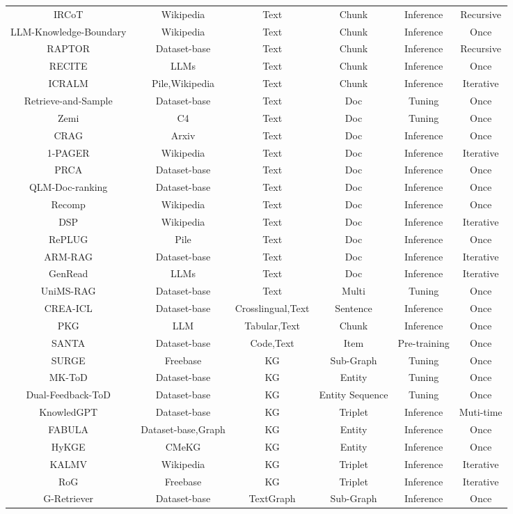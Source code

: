 \begin{table}
{\begin{tabular}{cccccc}
IRCoT~& Wikipedia& Text& Chunk& Inference&Recursive\\
LLM-Knowledge-Boundary~& Wikipedia& Text& Chunk& Inference&Once\\
RAPTOR~& Dataset-base&Text& Chunk& Inference&Recursive\\
RECITE~&   LLMs&Text&  Chunk&  Inference&Once\\ 
ICRALM~& Pile,Wikipedia& Text& Chunk& Inference&Iterative\\
Retrieve-and-Sample~& Dataset-base& Text& Doc& Tuning&Once\\
Zemi~& C4& Text& Doc& Tuning&Once\\
CRAG~& Arxiv& Text& Doc & Inference&Once\\
1-PAGER~ & Wikipedia& Text& Doc& Inference&Iterative\\
PRCA~& Dataset-base& Text& Doc& Inference&Once\\
QLM-Doc-ranking~& Dataset-base& Text& Doc& Inference&Once\\
Recomp~& Wikipedia& Text& Doc& Inference&Once\\
DSP~& Wikipedia& Text& Doc& Inference&Iterative\\
RePLUG~& Pile& Text& Doc& Inference&Once\\
ARM-RAG~& Dataset-base& Text& Doc& Inference&Iterative\\
GenRead~&   LLMs&Text&  Doc&  Inference&Iterative\\ 
UniMS-RAG~& Dataset-base& Text& Multi& Tuning&Once\\
CREA-ICL~& Dataset-base& Crosslingual,Text& Sentence& Inference&Once\\
PKG~& LLM& Tabular,Text& Chunk& Inference&Once\\
SANTA~& Dataset-base& Code,Text & Item &Pre-training&Once\\
SURGE~&Freebase& KG& Sub-Graph& Tuning&Once\\
MK-ToD~& Dataset-base& KG& Entity& Tuning&Once\\
Dual-Feedback-ToD~& Dataset-base& KG& Entity Sequence& Tuning&Once\\
KnowledGPT~& Dataset-base& KG& Triplet& Inference&Muti-time\\
FABULA~& Dataset-base,Graph& KG& Entity& Inference&Once\\
HyKGE~& CMeKG& KG& Entity& Inference&Once\\
KALMV~& Wikipedia& KG&Triplet & Inference&Iterative\\
RoG~& Freebase& KG& Triplet& Inference&Iterative\\
G-Retriever~& Dataset-base& TextGraph& Sub-Graph& Inference&Once\\
\bottomrule
\end{tabular}
}
\end{table}

